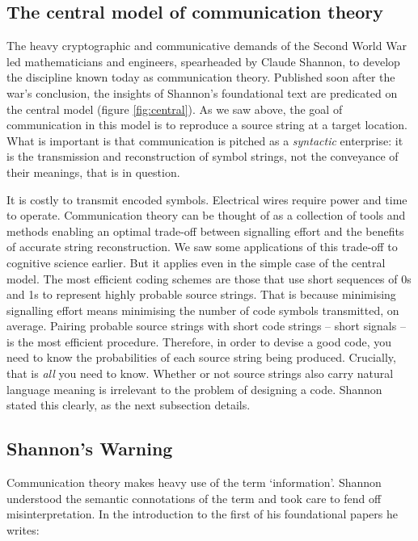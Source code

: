\documentclass[12pt]{article}
\begin{document}
\subsection{The central model of communication theory}\label{subsec:central}

The heavy cryptographic and communicative demands of the Second World War led mathematicians and engineers, spearheaded by Claude Shannon, to develop the discipline known today as communication theory.
Published soon after the war's conclusion, the insights of Shannon's foundational text \parencite*{shannon1948mathematicalc} are predicated on the central model (figure \ref{fig:central}).
As we saw above, the goal of communication in this model is to reproduce a source string at a target location.
What is important is that communication is pitched as a \textit{syntactic} enterprise: it is the transmission and reconstruction of symbol strings, not the conveyance of their meanings, that is in question.

It is costly to transmit encoded symbols.
Electrical wires require power and time to operate.
Communication theory can be thought of as a collection of tools and methods enabling an optimal trade-off between signalling effort and the benefits of accurate string reconstruction.
We saw some applications of this trade-off to cognitive science earlier.
But it applies even in the simple case of the central model.
The most efficient coding schemes are those that use short sequences of 0s and 1s to represent highly probable source strings.
That is because minimising signalling effort means minimising the number of code symbols transmitted, on average.
Pairing probable source strings with short code strings -- short signals -- is the most efficient procedure.
Therefore, in order to devise a good code, you need to know the probabilities of each source string being produced.
Crucially, that is \textit{all} you need to know.
Whether or not source strings also carry natural language meaning is irrelevant to the problem of designing a code.
Shannon stated this clearly, as the next subsection details.

\subsection{Shannon's Warning}\label{subsec:warning}

Communication theory makes heavy use of the term `information'.
Shannon understood the semantic connotations of the term and took care to fend off misinterpretation.
In the introduction to the first of his foundational papers he writes:
\end{document}
